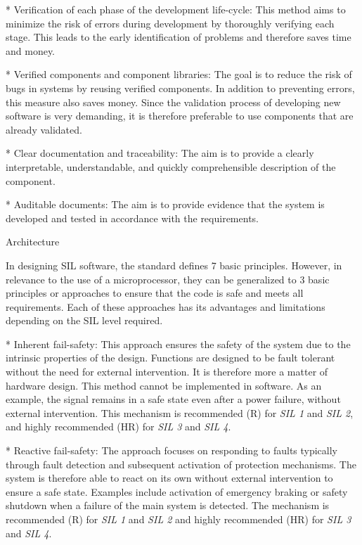 * {\sbf Verification of each phase of the development life-cycle}: This method aims to minimize the risk of errors during development by thoroughly verifying each stage. This leads to the early identification of problems and therefore saves time and money.

* {\sbf Verified components and component libraries}: The goal is to reduce the risk of bugs in systems by reusing verified components. In addition to preventing errors, this measure also saves money. Since the validation process of developing new software is very demanding, it is therefore preferable to use components that are already validated.

* {\sbf Clear documentation and traceability}: The aim is to provide a clearly interpretable, understandable, and quickly comprehensible description of the component.

* {\sbf Auditable documents}: The aim is to provide evidence that the system is developed and tested in accordance with the requirements.
\enditems

\secc Architecture

In designing SIL software, the standard defines 7 basic principles. However, in relevance to the use of a microprocessor, they can be generalized to 3 basic principles or approaches to ensure that the code is safe and meets all requirements. Each of these approaches has its advantages and limitations depending on the SIL level required.

\begitems
* {\sbf Inherent fail-safety}: This approach ensures the safety of the system due to the intrinsic properties of the design. Functions are designed to be fault tolerant without the need for external intervention. It is therefore more a matter of hardware design. This method cannot be implemented in software. As an example, the signal remains in a safe state even after a power failure, without external intervention. This mechanism is recommended (R) for {\it SIL 1} and {\it SIL 2}, and highly recommended (HR) for {\it SIL 3} and {\it SIL 4}.

* {\sbf Reactive fail-safety}: The approach focuses on responding to faults typically through fault detection and subsequent activation of protection mechanisms. The system is therefore able to react on its own without external intervention to ensure a safe state. Examples include activation of emergency braking or safety shutdown when a failure of the main system is detected. The mechanism is recommended (R) for {\it SIL 1} and {\it SIL 2} and highly recommended (HR) for {\it SIL 3} and {\it SIL 4}.


